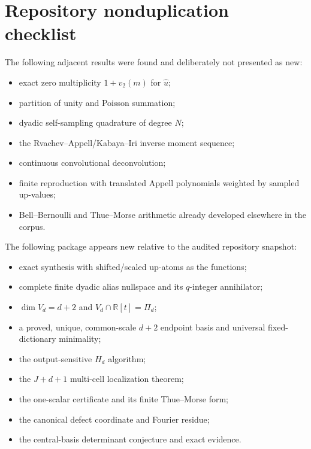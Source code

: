 \documentclass[11pt,oneside]{article}
\theoremstyle{definition}
\theoremstyle{remark}
\newcommand{\R}{\mathbb R}
\newcommand{\vtwo}{v_2}
\begin{document}
\section{Repository nonduplication checklist}

The following adjacent results were found and deliberately not presented as new:
\begin{itemize}
\item exact zero multiplicity $1+\vtwo(m)$ for $\widehat u$;
\item partition of unity and Poisson summation;
\item dyadic self-sampling quadrature of degree $N$;
\item the Rvachev--Appell/Kabaya--Iri inverse moment sequence;
\item continuous convolutional deconvolution;
\item finite reproduction with translated Appell polynomials weighted by sampled up-values;
\item Bell--Bernoulli and Thue--Morse arithmetic already developed elsewhere in the corpus.
\end{itemize}

The following package appears new relative to the audited repository snapshot:
\begin{itemize}
\item exact synthesis with shifted/scaled up-atoms as the functions;
\item complete finite dyadic alias nullspace and its $q$-integer annihilator;
\item $\dim V_d=d+2$ and $V_d\cap\R[t]=\Pi_d$;
\item a proved, unique, common-scale $d+2$ endpoint basis and universal fixed-dictionary minimality;
\item the output-sensitive $H_d$ algorithm;
\item the $J+d+1$ multi-cell localization theorem;
\item the one-scalar certificate and its finite Thue--Morse form;
\item the canonical defect coordinate and Fourier residue;
\item the central-basis determinant conjecture and exact evidence.
\end{itemize}
\end{document}
